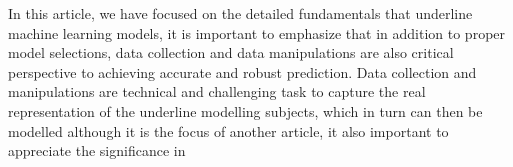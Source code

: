 
\par
In this article, we have focused on the detailed fundamentals that underline machine learning models, it is important to emphasize that in addition to proper model selections, data collection and data manipulations are also critical perspective to achieving accurate and robust prediction. Data collection and manipulations are technical and challenging task to capture the real representation of the underline modelling subjects, which in turn can then be modelled  although it is the focus of another article, it also important to appreciate the significance in 
\par 
